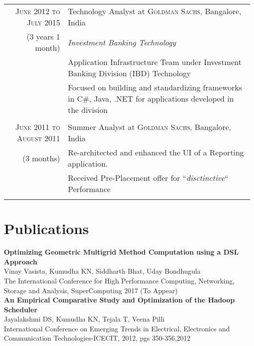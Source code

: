 \documentclass[a4paper,10pt]{article} %
\begin{document}
\begin{tabular}{r|p{10cm}}
\textsc{June 2012 to July 2015} & Technology Analyst at \textsc{Goldman Sachs}, Bangalore, India \\
{(3 years 1 month)}& \emph{Investment Banking Technology}\\ 
& \small {Application Infrastructure Team under Investment Banking Division (IBD) Technology} \\
& \small {Focused on building and standardizing frameworks in C\#, Java, .NET for
applications developed in the division}\\
& \\

\textsc{June 2011 to August 2011} & Summer Analyst at \textsc{Goldman Sachs}, Bangalore, India \\
{(3 months)}& \small{Re-architected and enhanced the UI of a Reporting application.}\\
& \footnotesize{ Received Pre-Placement offer for ``\emph{disctinctive}`` Performance }\\
& \\

\end{tabular}

\section{Publications}
\textbf{Optimizing Geometric Multigrid Method Computation using a DSL Approach}\\
\small{Vinay Vasista, Kumudha KN, Siddharth Bhat, Uday Bondhugula} \\
\small{The International Conference for High Performance Computing, Networking, Storage and Analysis, SuperComputing 2017 (To Appear)} \\


\textbf{An Empirical Comparative Study and Optimization of the Hadoop Scheduler} \\
\small{Jayalakshmi DS, Kumudha KN, Tejala T, Veena Pilli}\\
\small{International Conference on Emerging Trends in Electrical, Electronics and 
Communication Technologies-ICECIT, 2012, pgs 350-356,2012}

\newpage
\end{document}
